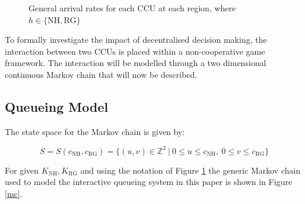 \documentclass{article}
\newcommand{\NH}{\text{NH}}
\newcommand{\RG}{\text{RG}}
\begin{document}
\begin{figure}[!htbp]
\begin{center}
\caption{General arrival rates for each CCU at each region, where $h\in\{\NH, \RG\}$} \label{arrivalrateregions}
\end{center}
\end{figure}

To formally investigate the impact of decentralised decision making, the interaction between two CCUs is placed within a non-cooperative game framework.
The interaction will be modelled through a two dimensional continuous Markov chain that will now be described.

\subsection{Queueing Model}

The state space for the Markov chain is given by:

\begin{equation}
S=S(c_{\NH}, c_{\RG})= \{(u,v)\in \mathbb{Z}^2\ |\ 0\leq u\leq c_{\NH},\ 0\leq v\leq c_{\RG}\} \label{statespace}
\end{equation}

For given $K_{\NH}, K_{\RG}$ and using the notation of Figure \ref{arrivalrateregions} the generic Markov chain used to model the interactive queueing system in this paper is shown in Figure \ref{mc}.
\end{document}
